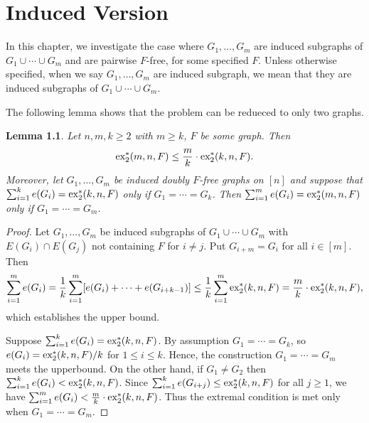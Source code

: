\documentclass[10pt, reqno]{report}
\newtheorem{lemma}[theorem]{Lemma}
\newcommand*{\dex}{\textnormal{ex}_2}
\begin{document}
\chapter{Induced Version}

In this chapter, we investigate the case where $G_1, \ldots, G_m$ are induced subgraphs of $G_1 \cup \cdots \cup G_m$ and are pairwise $F$-free, for some specified $F$. Unless otherwise specified, when we say $G_1, \ldots, G_m$ are induced subgraph, we mean that they are induced subgraphs of $G_1 \cup \cdots \cup G_m$.

The following lemma shows that the problem can be redueced to only two graphs.

\begin{lemma}\label{lem:induce-reduce}
  Let $n, m, k \geq 2$ with $m \geq k$, $F$ be some graph. Then
  \[
    \dex^*(m, n, F) \leq \frac{m}{k} \cdot \dex^*(k, n, F).
  \]
  Moreover, let $G_1, \ldots, G_m$ be induced doubly $F$-free graphs on $[n]$ and suppose that $\sum_{i = 1}^k e(G_i) = \dex^*(k, n, F)$ only if $G_1 = \cdots = G_k$. Then $\sum_{i = 1}^m e(G_i) = \dex^*(m, n, F)$ only if $G_1 = \cdots = G_m$.
\end{lemma}

\begin{proof}
  Let $G_1, \ldots, G_m$ be induced subgraphs of $G_1 \cup \cdots \cup G_m$ with $E(G_i) \cap E(G_j)$ not containing $F$ for $i \neq j$. Put $G_{i + m} = G_i$ for all $i \in [m]$. Then
  \[
    \sum_{i = 1}^m e(G_i) = \frac{1}{k}\sum_{i = 1}^m [e(G_i) + \cdots + e(G_{i + k - 1})] \leq \frac{1}{k}\sum_{i = 1}^m \dex^*(k, n, F) = \frac{m}{k} \cdot \dex^*(k, n, F),
  \]
  which establishes the upper bound.

  Suppose $\sum_{i = 1}^k e(G_i) = \dex^*(k, n, F)$. By assumption $G_1 = \cdots = G_k$, so $e(G_i) = \dex^*(k, n, F)/k$ for $1 \leq i \leq k$. Hence, the construction $G_1 = \cdots = G_m$ meets the upperbound. On the other hand, if $G_1 \neq G_2$ then $\sum_{i = 1}^k e(G_i) < \dex^*(k, n, F)$. Since $\sum_{i = 1}^k e(G_{i + j}) \leq \dex^*(k, n, F)$ for all $j \geq 1$, we have $\sum_{i = 1}^m e(G_i) < \frac{m}{k} \cdot \dex^*(k, n, F)$. Thus the extremal condition is met only when $G_1 = \cdots = G_m$.
\end{proof}
\end{document}
